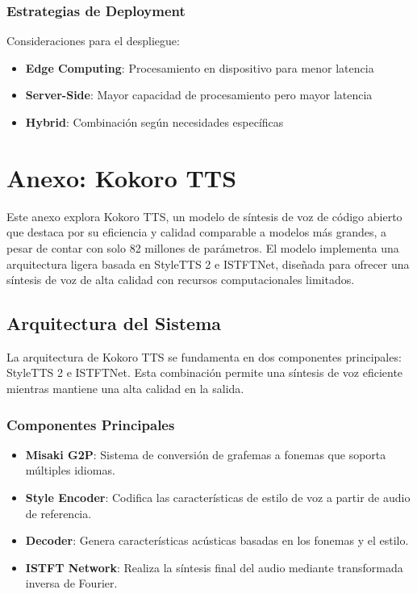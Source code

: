 \subsection{Estrategias de Deployment}
Consideraciones para el despliegue:

\begin{itemize}
	\item \textbf{Edge Computing}: Procesamiento en dispositivo para menor latencia
	\item \textbf{Server-Side}: Mayor capacidad de procesamiento pero mayor latencia
	\item \textbf{Hybrid}: Combinación según necesidades específicas
\end{itemize}

\chapter{Anexo: Kokoro TTS}
\label{anexo-kokoro}

Este anexo explora Kokoro TTS, un modelo de síntesis de voz de código abierto que destaca por su eficiencia y calidad comparable a modelos más grandes, a pesar de contar con solo 82 millones de parámetros. El modelo implementa una arquitectura ligera basada en StyleTTS 2 e ISTFTNet, diseñada para ofrecer una síntesis de voz de alta calidad con recursos computacionales limitados.

\section{Arquitectura del Sistema}
\label{sec:kokoro-architecture}

La arquitectura de Kokoro TTS se fundamenta en dos componentes principales: StyleTTS 2 e ISTFTNet. Esta combinación permite una síntesis de voz eficiente mientras mantiene una alta calidad en la salida.

\subsection{Componentes Principales}
\label{subsec:kokoro-main-components}

\begin{itemize}
	\item \textbf{Misaki G2P}: Sistema de conversión de grafemas a fonemas que soporta múltiples idiomas.
	\item \textbf{Style Encoder}: Codifica las características de estilo de voz a partir de audio de referencia.
	\item \textbf{Decoder}: Genera características acústicas basadas en los fonemas y el estilo.
	\item \textbf{ISTFT Network}: Realiza la síntesis final del audio mediante transformada inversa de Fourier.
\end{itemize}

